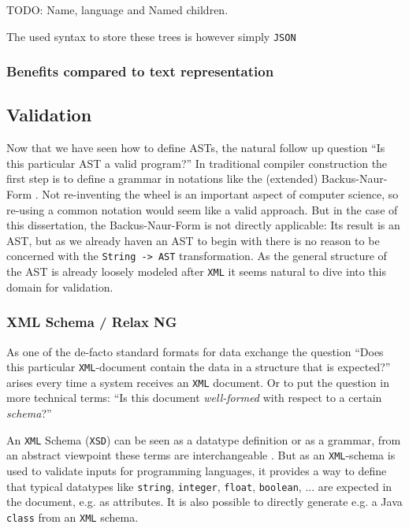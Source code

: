 TODO: Name, language and Named children.

The used syntax to store these trees is however simply \texttt{JSON}

\subsubsection{Benefits compared to text representation}

\subsection{Validation}

Now that we have seen how to define ASTs, the natural follow up question \enquote{Is this particular AST a valid program?} In traditional compiler construction the first step is to define a grammar in notations like the (extended) Backus-Naur-Form \cite{knuth_backus_1964}. Not re-inventing the wheel is an important aspect of computer science, so re-using a common notation would seem like a valid approach. But in the case of this dissertation, the Backus-Naur-Form is not directly applicable: Its result is an AST, but as we already haven an AST to begin with there is no reason to be concerned with the \texttt{String -> AST} transformation. As the general structure of the AST is already loosely modeled after \texttt{XML} it seems natural to dive into this domain for validation.

\subsubsection{XML Schema / Relax NG}

As one of the de-facto standard formats for data exchange the question \enquote{Does this particular \texttt{XML}-document contain the data in a structure that is expected?} arises every time a system receives an \texttt{XML} document. Or to put the question in more technical terms: \enquote{Is this document \textit{well-formed} with respect to a certain \textit{schema}?}

An \texttt{XML} Schema (\texttt{XSD}) \cite{xml_schema} can be seen as a datatype definition or as a grammar, from an abstract viewpoint these terms are interchangeable \cite[Chapter 5.3.4 \enquote{XML and Document Type Definitions}]{hopcroft_formal_languages}. But as an \texttt{XML}-schema is used to validate inputs for programming languages, it provides a way to define that typical datatypes like \texttt{string}, \texttt{integer}, \texttt{float}, \texttt{boolean}, ... are expected in the document, e.g. as attributes. It is also possible to directly generate e.g. a Java \texttt{class} from an \texttt{XML} schema.

